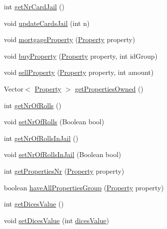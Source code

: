 \begin{DoxyCompactItemize}
int \hyperlink{class_monopoly_1_1_logic_1_1_player_ad21e0836ab5c9c2856b0109c0e701b40}{get\+Nr\+Card\+Jail} ()
\item 
void \hyperlink{class_monopoly_1_1_logic_1_1_player_abdc35813a10ca9287fcae445b608cfe8}{update\+Cards\+Jail} (int n)
\item 
void \hyperlink{class_monopoly_1_1_logic_1_1_player_a879e52a0d8181c287ad92c4b8a28a9b6}{mortgage\+Property} (\hyperlink{class_monopoly_1_1_logic_1_1_property}{Property} property)
\item 
void \hyperlink{class_monopoly_1_1_logic_1_1_player_ad996dcb61a56f2d654360cf20c6a6706}{buy\+Property} (\hyperlink{class_monopoly_1_1_logic_1_1_property}{Property} property, int id\+Group)
\item 
void \hyperlink{class_monopoly_1_1_logic_1_1_player_a038287240a4474f3647f474f04d8b717}{sell\+Property} (\hyperlink{class_monopoly_1_1_logic_1_1_property}{Property} property, int amount)
\item 
Vector$<$ \hyperlink{class_monopoly_1_1_logic_1_1_property}{Property} $>$ \hyperlink{class_monopoly_1_1_logic_1_1_player_a6ba450aac241567eb194142cecb1922a}{get\+Properties\+Owned} ()
\item 
int \hyperlink{class_monopoly_1_1_logic_1_1_player_a4931f562adff2bb9a90e9870a687ab92}{get\+Nr\+Of\+Rolls} ()
\item 
void \hyperlink{class_monopoly_1_1_logic_1_1_player_ab56147181edcec6bbbd1c4dff8c630b7}{set\+Nr\+Of\+Rolls} (Boolean bool)
\item 
int \hyperlink{class_monopoly_1_1_logic_1_1_player_a508585931f8d357c2535552a5c182474}{get\+Nr\+Of\+Rolls\+In\+Jail} ()
\item 
void \hyperlink{class_monopoly_1_1_logic_1_1_player_adb60a038f205641fae1b9c1cc375460f}{set\+Nr\+Of\+Rolls\+In\+Jail} (Boolean bool)
\item 
int \hyperlink{class_monopoly_1_1_logic_1_1_player_af41bd8293d5b9f239b08589b1016660c}{get\+Properties\+Nr} (\hyperlink{class_monopoly_1_1_logic_1_1_property}{Property} property)
\item 
boolean \hyperlink{class_monopoly_1_1_logic_1_1_player_a08631c9db2cdc0225393ce5699bbf44e}{have\+All\+Properties\+Group} (\hyperlink{class_monopoly_1_1_logic_1_1_property}{Property} property)
\item 
int \hyperlink{class_monopoly_1_1_logic_1_1_player_a469824453601f9ea9fafe9c705b1f86b}{get\+Dices\+Value} ()
\item 
void \hyperlink{class_monopoly_1_1_logic_1_1_player_a86e4fe7be709b46c21a8c9232c29e435}{set\+Dices\+Value} (int \hyperlink{class_monopoly_1_1_logic_1_1_player_a73973f9d5106195b500c2c99c7e72abd}{dices\+Value})
\end{DoxyCompactItemize}
